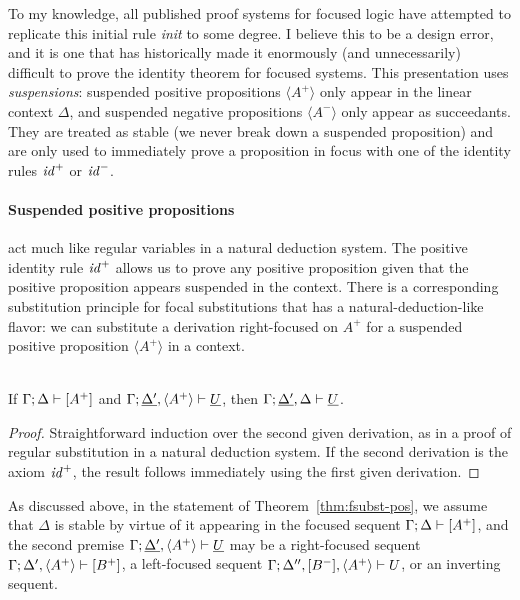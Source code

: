 To my knowledge, all published proof systems for focused logic have
attempted to replicate this initial rule {\it init} to some
degree. I believe this to
be a design error, and it is one that has historically made it
enormously (and unnecessarily) difficult to prove the identity theorem
for focused systems. This presentation uses {\it suspensions}:
suspended positive propositions $\langle A^+ \rangle$ only appear in
the linear context $\Delta$, and suspended negative propositions
$\langle A^- \rangle$ only appear as succeedants. They are treated as
stable (we never break down a suspended proposition) and are only used
to immediately prove a proposition in focus with one of the identity
rules ${\it id}^+$ or ${\it id}^-$.

\paragraph{Suspended positive propositions} act much like regular variables in a
natural deduction system. The positive identity rule ${\it id}^+$
allows us to prove any positive proposition given that the positive
proposition appears suspended in the context.  There is a
corresponding substitution principle for focal substitutions that has
a natural-deduction-like flavor: we can substitute a derivation
right-focused on $A^+$ for a suspended positive proposition $\langle
A^+ \rangle$ in a context.

\bigskip
\begin{theorem}\label{thm:fsubst-pos}~\\
If ${\Gamma};{\Delta} \vdash {[A^+]} \mathstrut$ 
and ${\Gamma};{\underline{\Delta'}, \langle A^+ \rangle} \vdash {\underline{U}} \mathstrut$, 
then ${\Gamma};{\underline{\Delta'}, \Delta} \vdash {\underline{U}} \mathstrut$.
\end{theorem}

\begin{proof}
  Straightforward induction over the second given derivation, as in a
  proof of regular substitution in a natural deduction system. If the
  second derivation is the axiom ${\it id}^+$, the result follows
  immediately using the first given derivation.
\end{proof}

\noindent
As discussed above, in the statement of Theorem~\ref{thm:fsubst-pos},
we assume that $\Delta$ is stable by virtue of it appearing in the
focused sequent ${\Gamma};{\Delta} \vdash {[A^+]} \mathstrut$, and the second
premise ${\Gamma};{\underline{\Delta'}, \langle A^+
  \rangle} \vdash {\underline{U}} \mathstrut$ may be a right-focused sequent
${\Gamma};{\Delta', \langle A^+ \rangle} \vdash {[B^+]} \mathstrut$, a
left-focused sequent ${\Gamma};{\Delta'', [B^-], \langle A^+
  \rangle} \vdash {U} \mathstrut$, or an inverting sequent.

